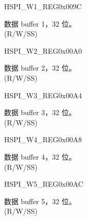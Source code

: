 \begin{register}{H}{SPI\_W1\_REG}{0x009C}\label{regdesc:SPIW1REG}
%
\regnewline%
\begin{regdesc}\begin{reglist}
\label{fielddesc:SPIBUF1}\item [SPI\_BUF1] 数据 buffer 1，32 位。\\
(R/W/SS)
\end{reglist}\end{regdesc}
\end{register}


\begin{register}{H}{SPI\_W2\_REG}{0x00A0}\label{regdesc:SPIW2REG}
%
\regnewline%
\begin{regdesc}\begin{reglist}
\label{fielddesc:SPIBUF2}\item [SPI\_BUF2] 数据 buffer 2，32 位。\\
(R/W/SS)
\end{reglist}\end{regdesc}
\end{register}


\begin{register}{H}{SPI\_W3\_REG}{0x00A4}\label{regdesc:SPIW3REG}
%
\regnewline%
\begin{regdesc}\begin{reglist}
\label{fielddesc:SPIBUF3}\item [SPI\_BUF3] 数据 buffer 3，32 位。\\
(R/W/SS)
\end{reglist}\end{regdesc}
\end{register}


\begin{register}{H}{SPI\_W4\_REG}{0x00A8}\label{regdesc:SPIW4REG}
%
\regnewline%
\begin{regdesc}\begin{reglist}
\label{fielddesc:SPIBUF4}\item [SPI\_BUF4] 数据 buffer 4，32 位。\\
(R/W/SS)
\end{reglist}\end{regdesc}
\end{register}


\begin{register}{H}{SPI\_W5\_REG}{0x00AC}\label{regdesc:SPIW5REG}
%
\regnewline%
\begin{regdesc}\begin{reglist}
\label{fielddesc:SPIBUF5}\item [SPI\_BUF5] 数据 buffer 5，32 位。\\
(R/W/SS)
\end{reglist}\end{regdesc}
\end{register}


